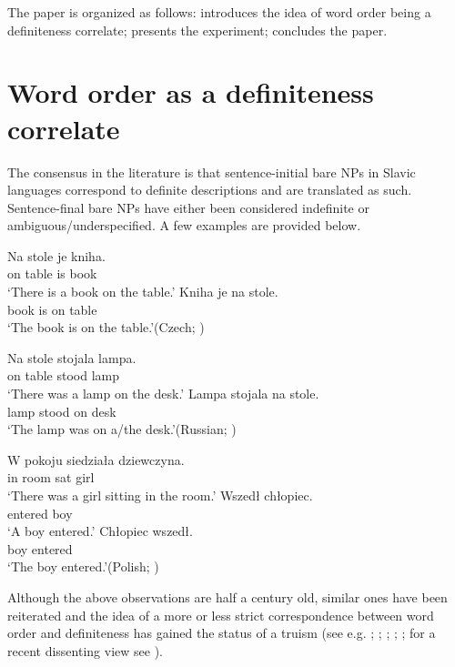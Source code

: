 \documentclass[output=paper]{langscibook}
\begin{document}
The paper is organized as follows:  introduces the idea of word order being a definiteness correlate;  presents the experiment;  concludes the paper.

\section{Word order as a definiteness correlate}\label{sim-dem:sec:wo}

The consensus in the literature is that sentence-initial bare NPs in Slavic languages correspond to definite descriptions and are translated as such. Sentence-final bare NPs have either been considered indefinite or ambiguous/under\-speci\-fied. A few examples are provided below.

\ea\ea\gll Na stole je kniha.\\
on table is book\\
\glt `There is a book on the table.'
\ex\gll Kniha je na stole.\\
book is on table\\
\glt `The book is on the table.'\hfill (Czech; \citealt[42]{Kramsky1972})
\z\z

\ea\label{sim-dem:ex:rus1}\ea\gll Na stole stojala lampa.\\
on table stood lamp\\
\glt `There was a lamp on the desk.'
\ex\gll Lampa stojala na stole.\\
lamp stood on desk\\
\glt `The lamp was on a/the desk.'\hfill (Russian; \citealt[266]{Chvany1973})
\z\z

\ea\label{sim-dem:ex:pol1}\gll W pokoju siedziała dziewczyna.\\
in room sat girl\\
\glt `There was a girl sitting in the room.'
\ea\gll Wszedł chłopiec.\label{sim-dem:ex:pol1a}\\
entered boy\\
\glt `A boy entered.'
\ex\gll Chłopiec wszedł.\label{sim-dem:ex:pol1b}\\
boy entered\\
\glt `The boy entered.'\hfill (Polish; \citealt[215]{Szwedek1974a})
\z\z

\noindent Although the above observations are half a century old, similar ones have been reiterated and the idea of a more or less strict correspondence between word order and definiteness has gained the status of a truism (see e.g. \citealt{Szwedek1974}; \citeyear{Szwedek2011}; \citealt{Hlavsa1975}; \citealt{Birkenmaier1979}; \citealt{Gladrow1979,Gladrow1989,Weiss1983,Yokoyama1986,Hauenschild1993,Junghanns.Zybatow1997,Nesset1999,Leiss2000,Brun2001,Biskup2006,Kucerova2007,Kucerova2012,Topolinjska2009,Geist2010,Titov2012,Titov2017,Czardybon2017}; for a recent dissenting view see \citealt{Buncic2014}).
\end{document}
